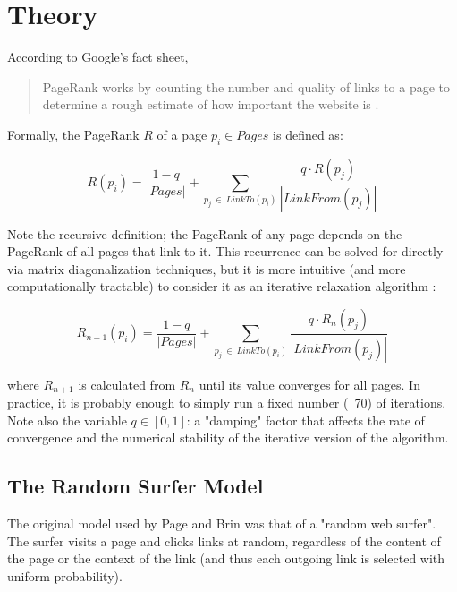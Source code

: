 \section{Theory} \label{sec:theory}
\newcommand{\vect}[1]{\boldsymbol{#1}}
\newcommand{\expc}[1]{\left< #1 \right>}

According to Google's fact sheet,
\begin{quote} 
PageRank works by counting the number and quality of links to a page to 
determine a rough estimate of how important the website is \cite{googlequote}. 
\end{quote}

Formally, the PageRank $R$ of a page $p_i \in Pages$ is defined as:

\begin{equation}\label{eqPRmain}
    R(p_i) = \frac{1 - q}{|Pages|} + \sum_{p_j \: \in \: LinkTo(p_i)} \frac{ q \cdot R(p_j) }{ |LinkFrom(p_j)| }
\end{equation}
    
Note the recursive definition; the PageRank of any page depends on the PageRank
of all pages that link to it.  This recurrence can be solved for directly via 
matrix diagonalization techniques, but it is more intuitive (and more 
computationally tractable) to consider it as an iterative relaxation algorithm \cite{efactory}:

\begin{equation}\label{eqPRiter}
    R_{n+1}(p_i) = \frac{1 - q}{|Pages|} + \sum_{p_j \: \in \: LinkTo(p_i)} \frac{ q \cdot R_n(p_j) }{ |LinkFrom(p_j)| }
\end{equation}

where $R_{n+1}$ is calculated from $R_n$ until its value converges for all pages.
In practice, it is probably enough to simply run a fixed number (~70) of iterations.
Note also the variable $q \in [0,1]$: a "damping" factor that affects the rate of 
convergence and the numerical stability of the iterative version of the algorithm.

\subsection{The Random Surfer Model} \label{sec:armodel}
The original model used by Page and Brin was that of a "random web surfer".
The surfer visits a page and clicks links at random, regardless of the content
of the page or the context of the link (and thus each outgoing link is selected
with uniform probability).  

